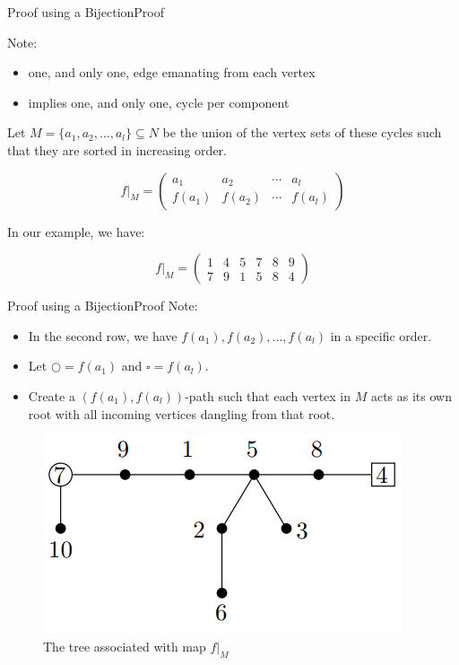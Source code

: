 \documentclass[10pt]{beamer}
\theoremstyle{definition}
\newcommand{\Sthree}{Proof using a Bijection}
\newcommand{\SthreeSSproof}{Proof}
\begin{document}
\begin{frame}{\Sthree}{\SthreeSSproof}

Note:
\begin{itemize}
  \item one, and only one, edge emanating from each vertex
  \item implies one, and only one, cycle per component
\end{itemize}

\pause{}

Let $M=\{a_{1}, a_{2}, \ldots, a_{l}\} \subseteq N$ be the union of the vertex sets of these cycles such that they are sorted in increasing order.

\[
  f|_{M} = \left(\begin{matrix}
      a_{1}  &   a_{2}  & \cdots &   a_{l} \\
    f(a_{1}) & f(a_{2}) & \cdots & f(a_{l})
  \end{matrix}\right)
\]

In our example, we have:

\[
  f|_{M} = \left(\begin{matrix}
      1 & 4 & 5 & 7 & 8 & 9 \\
      7 & 9 & 1 & 5 & 8 & 4
  \end{matrix}\right)
\]

\end{frame}

\begin{frame}{\Sthree}{\SthreeSSproof}
Note:
\begin{itemize}
  \item In the second row, we have $f(a_{1}), f(a_{2}), \ldots, f(a_{l})$ in a specific order.
  \pause{}
  \item Let $\bigcirc=f(a_{1})$ and $\square=f(a_{l})$.
  \pause{}
  \item Create a $(f(a_{1}),f(a_{l}))$-path such that each vertex in $M$ acts as its own root with all incoming vertices dangling from that root.
\end{itemize}

\pause{}

\begin{figure}
  \includegraphics[width=0.6\linewidth]{images/section3_tree.png}
  \caption{The tree associated with map $f|_{M}$}
  \label{fig:section3_tree}
\end{figure}

\end{frame}
\end{document}
